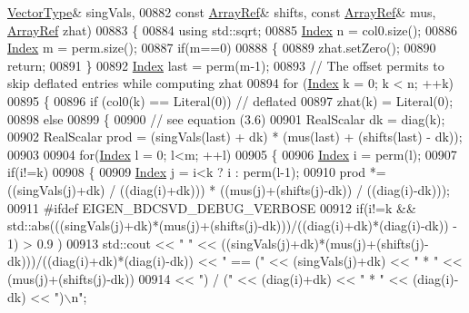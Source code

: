 \begin{DoxyCode}
      \hyperlink{group___core___module}{VectorType}& singVals,
00882     \textcolor{keyword}{const} \hyperlink{group___core___module_class_eigen_1_1_ref}{ArrayRef}& shifts, \textcolor{keyword}{const} \hyperlink{group___core___module_class_eigen_1_1_ref}{ArrayRef}& mus, \hyperlink{group___core___module_class_eigen_1_1_ref}{ArrayRef} zhat)
00883 \{
00884   \textcolor{keyword}{using} std::sqrt;
00885   \hyperlink{namespace_eigen_a62e77e0933482dafde8fe197d9a2cfde}{Index} n = col0.size();
00886   \hyperlink{namespace_eigen_a62e77e0933482dafde8fe197d9a2cfde}{Index} m = perm.size();
00887   \textcolor{keywordflow}{if}(m==0)
00888   \{
00889     zhat.setZero();
00890     \textcolor{keywordflow}{return};
00891   \}
00892   \hyperlink{namespace_eigen_a62e77e0933482dafde8fe197d9a2cfde}{Index} last = perm(m-1);
00893   \textcolor{comment}{// The offset permits to skip deflated entries while computing zhat}
00894   \textcolor{keywordflow}{for} (\hyperlink{namespace_eigen_a62e77e0933482dafde8fe197d9a2cfde}{Index} k = 0; k < n; ++k)
00895   \{
00896     \textcolor{keywordflow}{if} (col0(k) == Literal(0)) \textcolor{comment}{// deflated}
00897       zhat(k) = Literal(0);
00898     \textcolor{keywordflow}{else}
00899     \{
00900       \textcolor{comment}{// see equation (3.6)}
00901       RealScalar dk = diag(k);
00902       RealScalar prod = (singVals(last) + dk) * (mus(last) + (shifts(last) - dk));
00903 
00904       \textcolor{keywordflow}{for}(\hyperlink{namespace_eigen_a62e77e0933482dafde8fe197d9a2cfde}{Index} l = 0; l<m; ++l)
00905       \{
00906         \hyperlink{namespace_eigen_a62e77e0933482dafde8fe197d9a2cfde}{Index} i = perm(l);
00907         \textcolor{keywordflow}{if}(i!=k)
00908         \{
00909           \hyperlink{namespace_eigen_a62e77e0933482dafde8fe197d9a2cfde}{Index} j = i<k ? i : perm(l-1);
00910           prod *= ((singVals(j)+dk) / ((diag(i)+dk))) * ((mus(j)+(shifts(j)-dk)) / ((diag(i)-dk)));
00911 \textcolor{preprocessor}{#ifdef EIGEN\_BDCSVD\_DEBUG\_VERBOSE}
00912           \textcolor{keywordflow}{if}(i!=k && std::abs(((singVals(j)+dk)*(mus(j)+(shifts(j)-dk)))/((diag(i)+dk)*(diag(i)-dk)) - 1) >
       0.9 )
00913             std::cout << \textcolor{stringliteral}{"     "} << ((singVals(j)+dk)*(mus(j)+(shifts(j)-dk)))/((diag(i)+dk)*(diag(i)-dk)) 
      << \textcolor{stringliteral}{" == ("} << (singVals(j)+dk) << \textcolor{stringliteral}{" * "} << (mus(j)+(shifts(j)-dk))
00914                        << \textcolor{stringliteral}{") / ("} << (diag(i)+dk) << \textcolor{stringliteral}{" * "} << (diag(i)-dk) << \textcolor{stringliteral}{")\(\backslash\)n"};

\end{DoxyCode}
